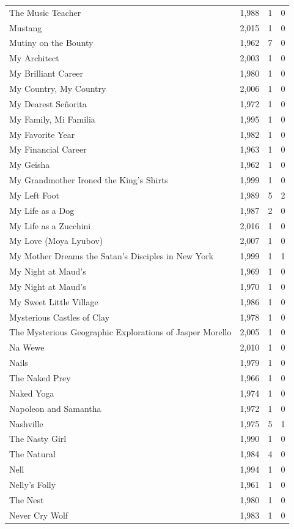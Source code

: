 \begin{tabular}{lrrr}
The Music Teacher & 1,988 & 1 & 0 \\
Mustang & 2,015 & 1 & 0 \\
Mutiny on the Bounty & 1,962 & 7 & 0 \\
My Architect & 2,003 & 1 & 0 \\
My Brilliant Career & 1,980 & 1 & 0 \\
My Country, My Country & 2,006 & 1 & 0 \\
My Dearest Señorita & 1,972 & 1 & 0 \\
My Family, Mi Familia & 1,995 & 1 & 0 \\
My Favorite Year & 1,982 & 1 & 0 \\
My Financial Career & 1,963 & 1 & 0 \\
My Geisha & 1,962 & 1 & 0 \\
My Grandmother Ironed the King's Shirts & 1,999 & 1 & 0 \\
My Left Foot & 1,989 & 5 & 2 \\
My Life as a Dog & 1,987 & 2 & 0 \\
My Life as a Zucchini & 2,016 & 1 & 0 \\
My Love (Moya Lyubov) & 2,007 & 1 & 0 \\
My Mother Dreams the Satan's Disciples in New York & 1,999 & 1 & 1 \\
My Night at Maud's & 1,969 & 1 & 0 \\
My Night at Maud's & 1,970 & 1 & 0 \\
My Sweet Little Village & 1,986 & 1 & 0 \\
Mysterious Castles of Clay & 1,978 & 1 & 0 \\
The Mysterious Geographic Explorations of Jasper Morello & 2,005 & 1 & 0 \\
Na Wewe & 2,010 & 1 & 0 \\
Nails & 1,979 & 1 & 0 \\
The Naked Prey & 1,966 & 1 & 0 \\
Naked Yoga & 1,974 & 1 & 0 \\
Napoleon and Samantha & 1,972 & 1 & 0 \\
Nashville & 1,975 & 5 & 1 \\
The Nasty Girl & 1,990 & 1 & 0 \\
The Natural & 1,984 & 4 & 0 \\
Nell & 1,994 & 1 & 0 \\
Nelly's Folly & 1,961 & 1 & 0 \\
The Nest & 1,980 & 1 & 0 \\
Never Cry Wolf & 1,983 & 1 & 0 \\

\end{tabular}
